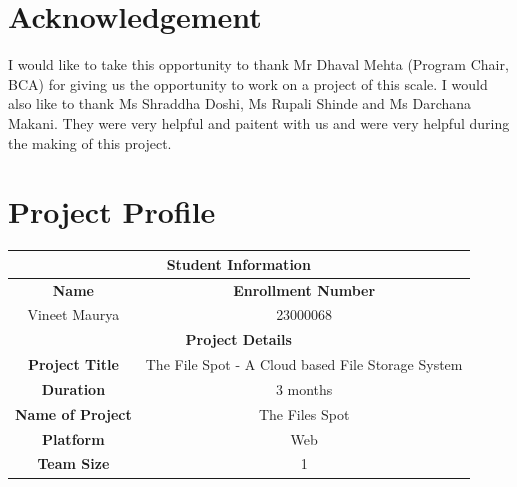 \documentclass[12pt,a4paper]{report}
\begin{document}
\chapter*{Acknowledgement}
I would like to take this opportunity to thank Mr Dhaval Mehta (Program Chair, BCA) for giving us the opportunity to work on a project of this scale.
I would also like to thank Ms Shraddha Doshi, Ms Rupali Shinde and Ms Darchana Makani. They were very helpful and paitent with us and were very helpful during the making of this project.
\newpage
\chapter*{Project Profile}
\begin{center}
	\begin{tabular}{|c|c|}
		\hline
		\multicolumn{2}{|c|}{\cellcolor{black} \color{white} \textbf{Student Information}} \\
		\hline
		\textbf{Name}            & \textbf{Enrollment Number}                              \\
		Vineet Maurya            & 23000068                                                \\
		\hline
		\multicolumn{2}{|c|}{\cellcolor{black} \color{white} \textbf{Project Details}}     \\
		\hline
		\textbf{Project Title}   & The File Spot - A Cloud based File Storage System       \\
		\hline
		\textbf{Duration}        & 3 months                                                \\
		\hline
		\textbf{Name of Project} & The Files Spot                                          \\
		\hline
		\textbf{Platform}        & Web                                                     \\
		\hline
		\textbf{Team Size}       & 1                                                       \\
		\hline
	\end{tabular}
\end{center}
\newpage
{}
\newpage
\end{document}
